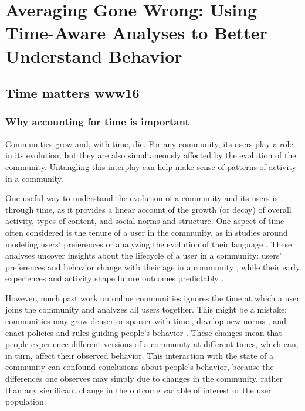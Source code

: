 \chapter{Averaging Gone Wrong: Using Time-Aware Analyses to Better Understand Behavior}

\section{Time matters www16} 

\subsection{Why accounting for time is important}

Communities grow and, with time, die. For any community, its users play a role in its evolution, but they are also simultaneously affected by the evolution of the community. Untangling this interplay can help make sense of patterns of activity in a community.

One useful way to understand the evolution of a community and its users is through time, as it provides a linear account of the growth (or decay) of overall activity, types of content, and social norms and structure.  One aspect of time often considered is the tenure of a user in the community, as in studies around modeling users' preferences \cite{McAuley2013} or analyzing the evolution of their language \cite{Danescu-niculescu-mizil2013}.  These analyses uncover insights about the lifecycle of a user in a community: users' preferences and behavior change with their age in a community \cite{Panciera2010}, while their early experiences and activity shape future outcomes predictably \cite{Tan2015,Yang2009,Panciera2009, Miller2015}. 

However, much past work on online communities ignores the time at which a user joins the community and analyzes all users together.
This might be a mistake: communities may grow denser or sparser with time \cite{Leskovec2005}, develop new norms \cite{Kooti2010}, and enact policies and rules guiding people's behavior \cite{Butler2008}.
These changes mean that people experience different versions of a community at different times, which can, in turn, affect their observed behavior. This interaction with the state of a community can confound conclusions about people's behavior, because the differences one observes may simply due to changes in the community, rather than any significant change in the outcome variable of interest or the user population.  



